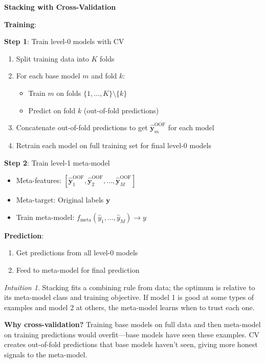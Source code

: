 \documentclass[11pt,twoside]{article}
\numberwithin{equation}{section}
\newcommand{\vect}[1]{\bm{#1}}
\theoremstyle{plain}
\theoremstyle{definition}
\theoremstyle{remark}
\newtheorem{intuition}[theorem]{Intuition}
\begin{document}
\begin{algorithmbox}
\textbf{Stacking with Cross-Validation}

\textbf{Training}:

\textbf{Step 1}: Train level-0 models with CV
\begin{enumerate}
\item Split training data into $K$ folds
\item For each base model $m$ and fold $k$:
\begin{itemize}
\item Train $m$ on folds $\{1, \ldots, K\} \setminus \{k\}$
\item Predict on fold $k$ (out-of-fold predictions)
\end{itemize}
\item Concatenate out-of-fold predictions to get $\hat{\vect{y}}_m^{\text{OOF}}$ for each model
\item Retrain each model on full training set for final level-0 models
\end{enumerate}

\textbf{Step 2}: Train level-1 meta-model
\begin{itemize}
\item Meta-features: $[\hat{\vect{y}}_1^{\text{OOF}}, \hat{\vect{y}}_2^{\text{OOF}}, \ldots, \hat{\vect{y}}_M^{\text{OOF}}]$
\item Meta-target: Original labels $\vect{y}$
\item Train meta-model: $f_{\text{meta}}(\hat{y}_1, \ldots, \hat{y}_M) \to y$
\end{itemize}

\textbf{Prediction}:
\begin{enumerate}
\item Get predictions from all level-0 models
\item Feed to meta-model for final prediction
\end{enumerate}
\end{algorithmbox}

\begin{intuition}
Stacking fits a combining rule from data; the optimum is relative to its meta-model class and training objective. If model 1 is good at some types of examples and model 2 at others, the meta-model learns when to trust each one.

\textbf{Why cross-validation?} Training base models on full data and then meta-model on training predictions would overfit---base models have seen these examples. CV creates out-of-fold predictions that base models haven't seen, giving more honest signals to the meta-model.
\end{intuition}
\end{document}
